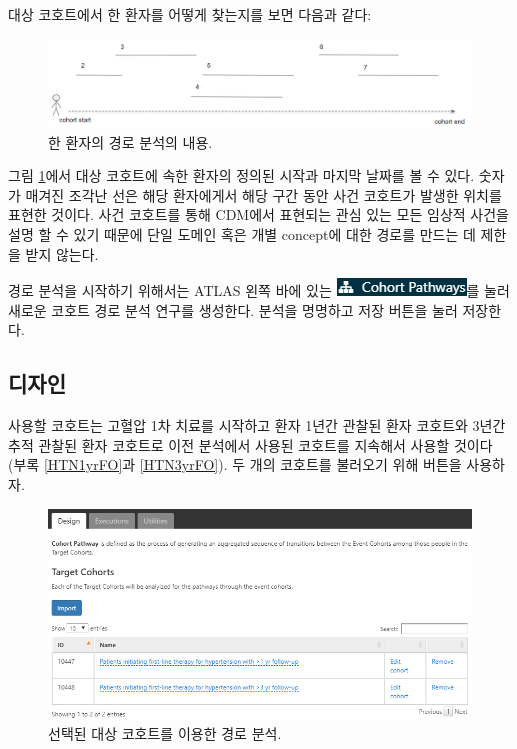 \documentclass[10.5pt]{book}
\theoremstyle{definition}
\theoremstyle{definition}
\theoremstyle{definition}
\theoremstyle{remark}
\begin{document}
대상 코호트에서 한 환자를 어떻게 찾는지를 보면 다음과 같다:

\begin{figure}

{\centering \includegraphics[width=1\linewidth]{images/Characterization/pathwaysPersonEventView} 

}

\caption{한 환자의 경로 분석의 내용.}\label{fig:pathwaysPersonEventView}
\end{figure}

그림 \ref{fig:pathwaysPersonEventView}에서 대상 코호트에 속한 환자의
정의된 시작과 마지막 날짜를 볼 수 있다. 숫자가 매겨진 조각난 선은 해당
환자에게서 해당 구간 동안 사건 코호트가 발생한 위치를 표현한 것이다.
사건 코호트를 통해 CDM에서 표현되는 관심 있는 모든 임상적 사건을 설명 할
수 있기 때문에 단일 도메인 혹은 개별 concept에 대한 경로를 만드는 데
제한을 받지 않는다.

경로 분석을 시작하기 위해서는 ATLAS 왼쪽 바에 있는
\includegraphics{images/Characterization/atlasPathwaysMenuItem.png}를
눌러 새로운 코호트 경로 분석 연구를 생성한다. 분석을 명명하고 저장
버튼을 눌러 저장한다.

\subsection{디자인}

사용할 코호트는 고혈압 1차 치료를 시작하고 환자 1년간 관찰된 환자
코호트와 3년간 추적 관찰된 환자 코호트로 이전 분석에서 사용된 코호트를
지속해서 사용할 것이다 (부록 \ref{HTN1yrFO}과 \ref{HTN3yrFO}). 두 개의
코호트를 불러오기 위해 버튼을 사용하자.

\begin{figure}

{\centering \includegraphics[width=1\linewidth]{images/Characterization/atlasPathwaysTargetCohorts} 

}

\caption{선택된 대상 코호트를 이용한 경로 분석.}\label{fig:atlasPathwaysTargetCohorts}
\end{figure}
\end{document}
